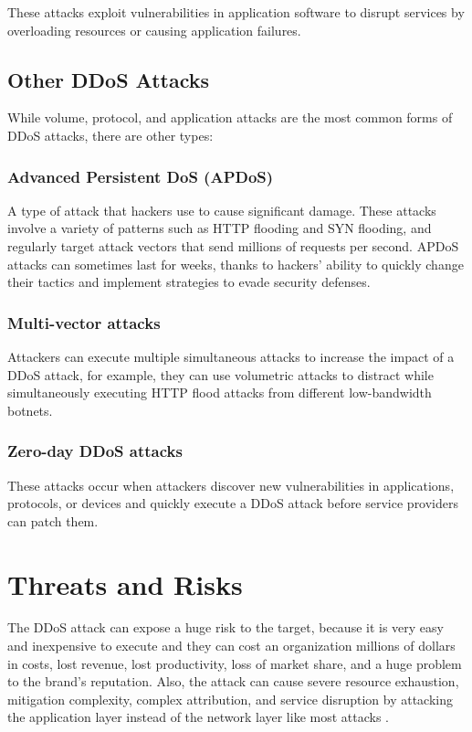 \documentclass[a4paper, 12pt]{report} %
\begin{document}
\begin{table}[h!]
        These attacks exploit vulnerabilities in application software to disrupt services by overloading resources or causing application failures.

        \subsection{Other DDoS Attacks}
        While volume, protocol, and application attacks are the most common forms of DDoS attacks, there are other types:

            \subsubsection{Advanced Persistent DoS (APDoS)}
            A type of attack that hackers use to cause significant damage. These attacks involve a variety of patterns such as HTTP flooding and SYN flooding, and regularly target attack vectors that send millions of requests per second. APDoS attacks can sometimes last for weeks, thanks to hackers’ ability to quickly change their tactics and implement strategies to evade security defenses.

            \subsubsection{Multi-vector attacks}
            Attackers can execute multiple simultaneous attacks to increase the impact of a DDoS attack, for example, they can use volumetric attacks to distract while simultaneously executing HTTP flood attacks from different low-bandwidth botnets.

            \subsubsection{Zero-day DDoS attacks}
            These attacks occur when attackers discover new vulnerabilities in applications, protocols, or devices and quickly execute a DDoS attack before service providers can patch them.

        \section{Threats and Risks}
            The DDoS attack can expose a huge risk to the target, because it is very easy and inexpensive to execute and they can cost an organization millions of dollars in costs, lost revenue, lost productivity, loss of market share, and a huge problem to the brand’s reputation. Also, the attack can cause severe resource exhaustion, mitigation complexity, complex attribution, and service disruption by attacking the application layer instead of the network layer like most attacks \cite{radwareShieldSquareCaptcha}.
            

\end{table}
\end{document}
